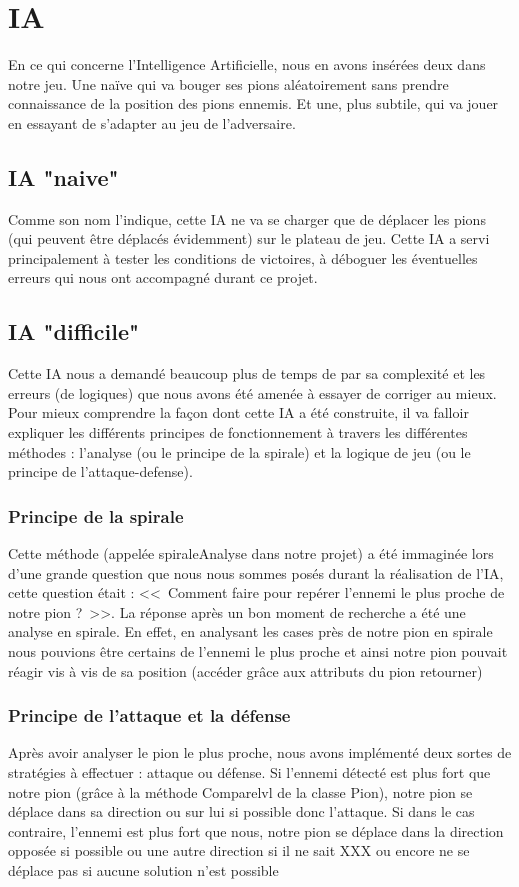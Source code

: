 \documentclass[10pt]{article}
\begin{document}
\section{IA}
 En ce qui concerne l'Intelligence Artificielle, nous en avons insérées deux dans notre jeu. Une naïve qui va bouger ses pions aléatoirement sans prendre connaissance de la position des pions ennemis. Et une, plus subtile, qui va jouer en essayant de s'adapter au jeu de l'adversaire.
\subsection{IA "naive"}

Comme son nom l'indique, cette IA ne va se charger que de déplacer les pions (qui peuvent être déplacés évidemment) sur le plateau de jeu.
Cette IA a servi principalement à tester les conditions de victoires, à déboguer les éventuelles erreurs qui nous ont accompagné durant ce projet.

\subsection {IA "difficile"}
Cette IA nous a demandé beaucoup plus de temps de par sa complexité et les erreurs (de logiques) que nous avons été amenée à essayer de corriger au mieux. Pour mieux comprendre la façon dont cette IA a été construite, il va falloir expliquer les différents principes de fonctionnement à travers les différentes méthodes : l'analyse (ou le principe de la spirale) et la logique de jeu (ou le principe de l'attaque-defense).

\subsubsection {Principe de la spirale}
Cette méthode (appelée spiraleAnalyse dans notre projet) a été immaginée lors d'une grande question que nous nous sommes posés durant la réalisation de l'IA, cette question était : <<~Comment faire pour repérer l'ennemi le plus proche de notre pion ?~>>. La réponse après un bon moment de recherche a été une analyse en spirale. En effet, en analysant les cases près de notre pion en spirale nous pouvions être certains de l'ennemi le plus proche et ainsi notre pion pouvait réagir vis à vis de sa position (accéder grâce aux attributs du pion retourner)  
\subsubsection {Principe de l'attaque et la défense}
Après avoir analyser le pion le plus proche, nous avons implémenté deux sortes de stratégies à effectuer : attaque ou défense. Si l'ennemi détecté est plus fort que notre pion (grâce à la méthode Comparelvl de la classe Pion), notre pion se déplace dans sa direction ou sur lui si possible donc l'attaque. Si dans le cas contraire, l'ennemi est plus fort que nous, notre pion se déplace dans la direction opposée si possible ou une autre direction si il ne sait XXX
ou encore ne se déplace pas si aucune solution n'est possible 
\end{document}

